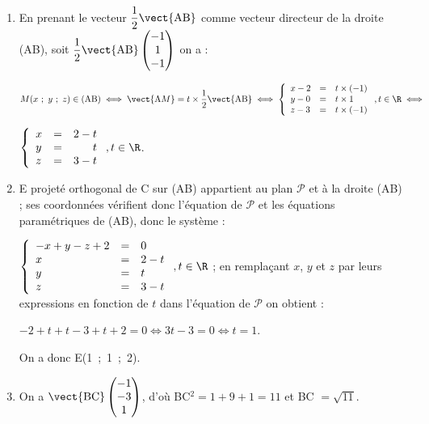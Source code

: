 \begin{enumerate}
\begin{enumerate}
Avec $\vect{\text{C}M}\begin{pmatrix}x + 1\\y + 1\\z - 2\end{pmatrix}$, on obtient :

$-2(x + 1) + 2(y + 1) -2(z - 2) = 0 \iff -(x + 1) + (y + 1) - (z - 2) = 0 \iff - x + y - z + 2 = 0$.
		\item 
		En prenant le vecteur $\dfrac{1}{2}\vect{\text{AB}}$ comme vecteur directeur de la droite (AB), soit $\dfrac12\vect{\text{AB}}\begin{pmatrix}-1\\1\\-1\end{pmatrix}$ on a :
		
$M(x~;~y~;~z) \in (\text{AB}) \iff \vect{\text{A}M} = t\times \dfrac12\vect{\text{AB}} \iff \left\{\begin{array}{l c l}
x - 2&=&t \times (- 1)\\
y - 0 &=&t \times 1\\
z - 3&=&t \times (-1)
\end{array}\right., t \in \R \iff$

$ \left\{\begin{array}{l c r}
x &=& 2 - t\\
y &=&t \\
z &=& 3 - t 
\end{array}\right., t \in \R$.
		\item 

E projeté orthogonal de C sur (AB) appartient au plan $\mathcal{P}$ et à la droite (AB) ; ses coordonnées vérifient donc l'équation de $\mathcal{P}$ et les équations paramétriques de (AB), donc le système :

$\left\{\begin{array}{l c l}
- x + y - z + 2 &=& 0\\
x &=& 2 - t\\
y &=&t \\
z &=& 3 - t 
\end{array}\right., t \in \R$ ; en remplaçant $x$, $y$ et $z$ par leurs expressions en fonction de $t$ dans l'équation de $\mathcal{P}$ on obtient :

$- 2 + t  + t - 3 + t + 2 = 0\iff 3t - 3 = 0 \iff t = 1$.

On a donc E(1~;~1~;~2).
		\item 
On a $\vect{\text{BC}}\begin{pmatrix}-1\\-3\\1\end{pmatrix}$, d'où BC$^2 = 1 + 9 + 1 = 11$ et BC $ = \sqrt{11}$.
		

\end{enumerate}
\end{enumerate}
